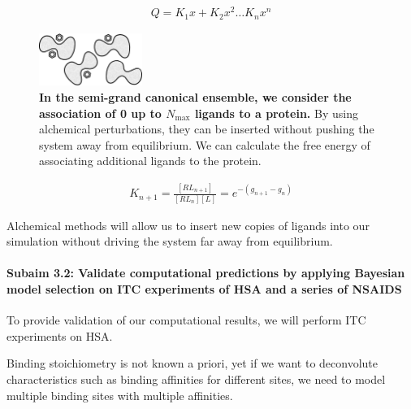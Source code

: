 \documentclass[10pt,final]{article}
\newcommand{\subsubsubsection}[1]{\paragraph*{#1}}
\begin{document}
\begin{align}
 Q = K_1x + K_2x^2 \dots K_n x^n
\end{align}


\begin{figure}[H]
  \centering
  \includegraphics[width=0.3\textwidth]{figures/semi-grand2.png}
  \caption{\textbf{In the semi-grand canonical ensemble, we consider the association of 0 up to $N_\mathrm{max}$ ligands to a protein. }By using alchemical perturbations, they can be inserted without pushing the system away from equilibrium. We can calculate the free energy of associating additional ligands to the protein.}
  \label{figure:semigrand}
\end{figure}


\begin{align}
K_{n+1} = \frac{[RL_{n+1}]}{[RL_n][L]} = e^{-(g_{n+1}-g_n)}
\label{eq:K_eq}
\end{align}



Alchemical methods will allow us to insert new copies of ligands into our simulation without driving the system far away from equilibrium. 

\subsubsubsection{Subaim 3.2: Validate computational predictions by applying Bayesian model selection on ITC  experiments of HSA and a series of NSAIDS}
To provide validation of our computational results, we will perform ITC experiments on HSA.

Binding stoichiometry is not known a priori, yet if we want to deconvolute characteristics such as binding affinities for different sites, we need to model multiple binding sites with multiple affinities.
\end{document}
